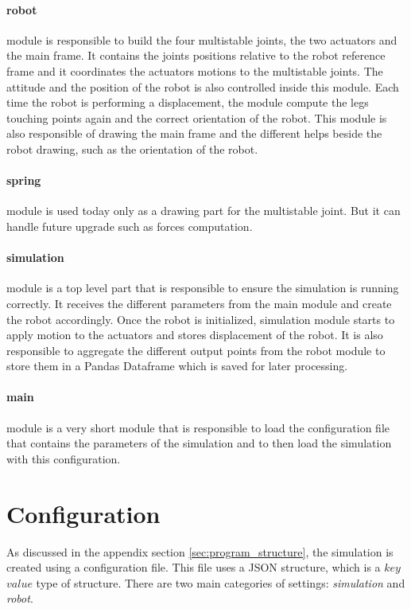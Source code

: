         \paragraph{robot}
            module is responsible to build the four multistable joints, the two actuators and the main frame. It contains the joints positions relative to the robot reference frame and it coordinates the actuators motions to the multistable joints. The attitude and the position of the robot is also controlled inside this module. Each time the robot is performing a displacement, the module compute the legs touching points again and the correct orientation of the robot. This module is also responsible of drawing the main frame and the different helps beside the robot drawing, such as the orientation of the robot.
        \paragraph{spring}
            module is used today only as a drawing part for the multistable joint. But it can handle future upgrade such as forces computation. 
        \paragraph{simulation}
            module is a top level part that is responsible to ensure the simulation is running correctly. It receives the different parameters from the main module and create the robot accordingly. Once the robot is initialized, simulation module starts to apply motion to the actuators and stores displacement of the robot. It is also responsible to aggregate the different output points from the robot module to store them in a Pandas Dataframe which is saved for later processing. 
        \paragraph{main}
            module is a very short module that is responsible to load the configuration file that contains the parameters of the simulation and to then load the simulation with this configuration.

    \section{Configuration}\label{sec:config}
        As discussed in the appendix section \ref{sec:program_structure}, the simulation is created using a configuration file. This file uses a JSON structure, which is a $key$ $value$ type of structure. There are two main categories of settings: \textit{simulation} and \textit{robot}. 
        
